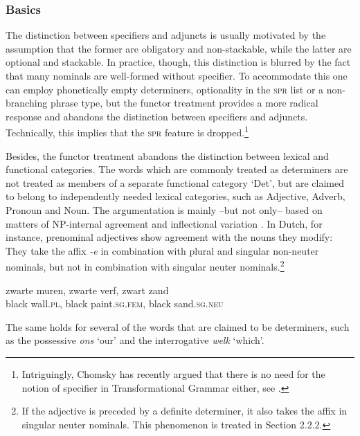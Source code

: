 \documentclass[output=paper
                ,modfonts
                ,nonflat
	        ,collection
	        ,collectionchapter
	        ,collectiontoclongg
 	        ,biblatex
                ,babelshorthands
                ,newtxmath
                ,draftmode
                ,colorlinks, citecolor=brown
]{./langsci/langscibook}
\begin{document}
\subsubsection{Basics} 
\label{sec-basics}


The distinction between specifiers and adjuncts is usually motivated by 
the assumption that the former are obligatory and non-stackable, while the latter  
are optional and stackable. In practice, though, this distinction 
is blurred by the fact that many nominals are well-formed without specifier.
To accommodate this one can employ phonetically empty determiners, optionality in 
the \textsc{spr} list or a non-branching phrase type,   
but the functor treatment provides a more radical response and abandons 
the distinction between specifiers and adjuncts. 
Technically, this implies that the \textsc{spr} feature is dropped.\footnote{Intriguingly,
Chomsky has recently argued that there is no need for the notion of specifier in 
Transformational Grammar either, see \citet[43]{Chomsky13}.}  

Besides, the functor treatment abandons the distinction between lexical and 
functional categories. The words which are commonly treated as determiners
are not treated as members of a separate functional category `Det', but are 
claimed to belong to independently needed lexical categories, such as Adjective, 
Adverb, Pronoun and Noun. The argumentation is mainly --but not only-- based on 
matters of NP-internal agreement and inflectional variation \citep{VanEynde06}. 
In Dutch, for instance, prenominal adjectives show agreement with 
the nouns they modify: They take the affix \emph{-e} in combination with plural 
and singular non-neuter nominals, but not in combination with singular 
neuter nominals.\footnote{If the adjective is preceded by a definite determiner, 
it also takes the affix in singular neuter nominals. This phenomenon is treated 
in Section 2.2.2.} 

\begin{exe} 
\ex\label{wit} 
\gll  zwarte muren,        zwarte verf,              zwart zand \\
      black wall.\textsc{pl}, black paint.\textsc{sg.fem}, black sand.\textsc{sg.neu} \\
\end{exe} 

\noindent
The same holds for several of the words that are claimed to be determiners, 
such as the possessive \emph{ons} `our' and the interrogative \emph{welk} `which'. 
\end{document}
